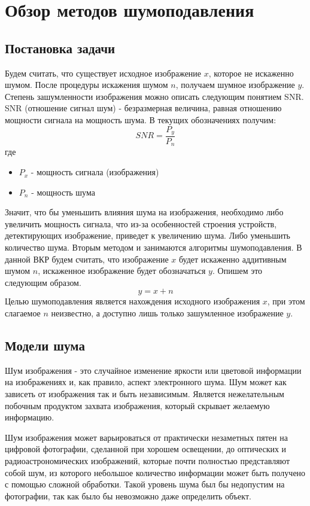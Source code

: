 \section{Обзор методов шумоподавления}
\subsection{Постановка задачи}
Будем считать, что существует исходное изображение $x$, которое не искаженно шумом. После процедуры искажения шумом $n$, получаем шумное изображение $y$. Степень зашумленности изображения можно описать следующим понятием SNR.
SNR (отношение сигнал шум) - безразмерная величина, равная отношению мощности сигнала на мощность шума. В текущих обозначениях получим:
\begin{equation}
	SNR = \frac{P_y}{P_n}
\end{equation} 
где
\begin{itemize}
	\item $P_x$ - мощность сигнала (изображения)
	\item $P_n$ - мощность шума
\end{itemize}
Значит, что бы уменьшить влияния шума на изображения, необходимо либо увеличить мощность сигнала, что из-за особенностей строения устройств, детектирующих изображение, приведет к увеличению шума. Либо уменьшить количество шума. Вторым методом и занимаются алгоритмы шумоподавления.
В данной ВКР будем считать, что изображение $x$ будет искаженно аддитивным шумом $n$, искаженное изображение будет обозначаться $y$. Опишем это следующим образом.
\begin{equation}
	y = x + n
\end{equation}
Целью шумоподавления является нахождения  исходного изображения $x$, при этом слагаемое $n$ неизвестно, а доступно лишь только зашумленное изображение $y$.



\subsection{Модели шума}
Шум изображения - это случайное изменение яркости или цветовой информации на изображениях и, как правило, аспект электронного шума. Шум может как зависеть от изображения так и быть независимым. Является нежелательным побочным продуктом захвата изображения, который скрывает желаемую информацию.

Шум изображения может варьироваться от практически незаметных пятен на цифровой фотографии, сделанной при хорошем освещении, до оптических и радиоастрономических изображений, которые почти полностью представляют собой шум, из которого небольшое количество информации может быть получено с помощью сложной обработки. Такой уровень шума был бы недопустим на фотографии, так как было бы невозможно даже определить объект\cite{Noise}.

